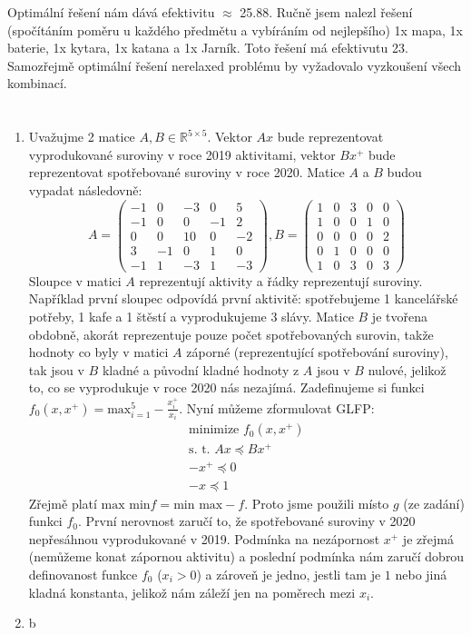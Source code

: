 \documentclass[12pt, a4paper]{article}
\begin{document}
Optimální řešení nám dává efektivitu $\approx$ 25.88. Ručně jsem nalezl řešení (spočítáním poměru  u každého předmětu a vybíráním od nejlepšího) 1x mapa, 1x baterie, 1x kytara, 1x katana a 1x Jarník. Toto řešení má efektivutu 23. Samozřejmě optimální řešení nerelaxed problému by vyžadovalo vyzkoušení všech kombinací.

\section{}
\begin{enumerate}[label=\alph*)]
\item Uvažujme 2 matice $A,B \in \mathbb{R}^{5 \times 5}$. Vektor $Ax$ bude reprezentovat vyprodukované suroviny v roce 2019 aktivitami, vektor $Bx^{+}$ bude reprezentovat spotřebované suroviny v roce 2020. Matice $A$ a $B$ budou vypadat následovně:
\[
A = \begin{pmatrix}
-1 & 0 & -3 & 0 & 5\\
-1 & 0 & 0 & -1 & 2\\
0 & 0 & 10 & 0 & -2\\
3 & -1 & 0 & 1 & 0\\
-1 & 1 & -3 & 1 & -3
\end{pmatrix},
B = \begin{pmatrix}
1 & 0 & 3 & 0 & 0\\
1 & 0 & 0 & 1 & 0\\
0 & 0 & 0 & 0 & 2\\
0 & 1 & 0 & 0 & 0\\
1 & 0 & 3 & 0 & 3 
\end{pmatrix}
\]
Sloupce v matici $A$ reprezentují aktivity a řádky reprezentují suroviny. Například první sloupec odpovídá první aktivitě: spotřebujeme 1 kancelářské potřeby, 1 kafe a 1 štěstí a vyprodukujeme 3 slávy. Matice $B$ je tvořena obdobně, akorát reprezentuje pouze počet spotřebovaných surovin, takže hodnoty co byly v matici $A$ záporné (reprezentující spotřebování suroviny), tak jsou v $B$ kladné a původní kladné hodnoty z $A$ jsou v $B$ nulové, jelikož to, co se vyprodukuje v roce 2020 nás nezajímá. Zadefinujeme si funkci $f_0(x,x^{+}) = \text{max}_{i=1}^5 -\frac{x_i^{+}}{x_i}$. Nyní můžeme zformulovat GLFP:
\begin{gather*}
\text{minimize } f_0(x,x^{+})\\
\text{s. t. } Ax \preceq Bx^{+}\\
-x^{+} \preceq 0\\
-x \preceq 1 
\end{gather*}
Zřejmě platí $\text{max min} f = \text{min max} -f$. Proto jsme použili místo $g$ (ze zadání) funkci $f_0$. První nerovnost zaručí to, že spotřebované suroviny v 2020 nepřesáhnou vyprodukované v 2019. Podmínka na nezápornost $x^+$ je zřejmá (nemůžeme konat zápornou aktivitu) a poslední podmínka nám zaručí dobrou definovanost funkce $f_0$ ($x_i > 0$) a zároveň je jedno, jestli tam je $1$ nebo jiná kladná konstanta, jelikož nám záleží jen na poměrech mezi $x_i$.

\item b
\end{enumerate}
\end{document}
